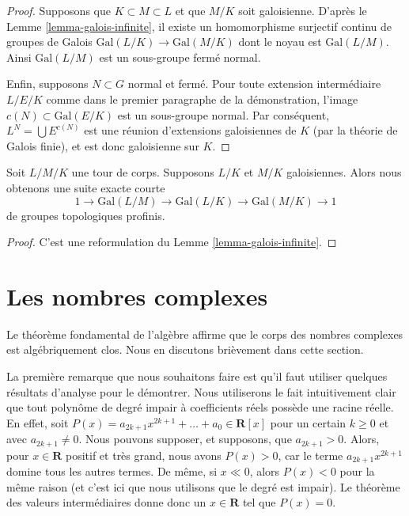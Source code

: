 \begin{proof}
\medskip\noindent
Supposons que $K \subset M \subset L$ et que $M/K$ soit galoisienne.
D'après le Lemme \ref{lemma-galois-infinite}, il existe un homomorphisme surjectif
continu de groupes de Galois
$\text{Gal}(L/K) \to \text{Gal}(M/K)$ dont le
noyau est $\text{Gal}(L/M)$. Ainsi $\text{Gal}(L/M)$ est un sous-groupe
fermé normal.

\medskip\noindent
Enfin, supposons $N \subset G$ normal et fermé. Pour toute
extension intermédiaire $L/E/K$ comme dans le premier paragraphe de la démonstration, l'image
$c(N) \subset \text{Gal}(E/K)$ est un sous-groupe normal.
Par conséquent, $L^N = \bigcup E^{c(N)}$ est une réunion d'extensions galoisiennes
de $K$ (par la théorie de Galois finie), et est donc galoisienne sur $K$.
\end{proof}

\begin{lemma}
\label{lemma-ses-infinite-galois}
Soit $L/M/K$ une tour de corps. Supposons $L/K$ et $M/K$ galoisiennes.
Alors nous obtenons une suite exacte courte
$$
1 \to \text{Gal}(L/M) \to \text{Gal}(L/K) \to \text{Gal}(M/K) \to 1
$$
de groupes topologiques profinis.
\end{lemma}

\begin{proof}
C'est une reformulation du Lemme \ref{lemma-galois-infinite}.
\end{proof}





\section{Les nombres complexes}
\label{section-complex-numbers}

\noindent
Le théorème fondamental de l'algèbre affirme que le corps des nombres complexes
est algébriquement clos. Nous en discutons brièvement dans cette section.

\medskip\noindent
La première remarque que nous souhaitons faire est qu'il faut utiliser quelques
résultats d'analyse pour le démontrer. Nous utiliserons le fait intuitivement
clair que tout polynôme de degré impair à coefficients réels possède une racine réelle.
En effet, soit
$P(x) = a_{2k + 1} x^{2k + 1} + \ldots + a_0 \in \mathbf{R}[x]$
pour un certain $k \geq 0$ et avec $a_{2k + 1} \not = 0$.
Nous pouvons supposer, et supposons, que $a_{2k + 1} > 0$. Alors, pour
$x \in \mathbf{R}$ positif et très grand, nous avons $P(x) > 0$, car le terme
$a_{2k + 1} x^{2k + 1}$ domine tous les autres termes. De même,
si $x \ll 0$, alors $P(x) < 0$ pour la même raison (et c'est ici
que nous utilisons que le degré est impair). Le théorème des valeurs
intermédiaires donne donc un $x \in \mathbf{R}$ tel que $P(x) = 0$.

